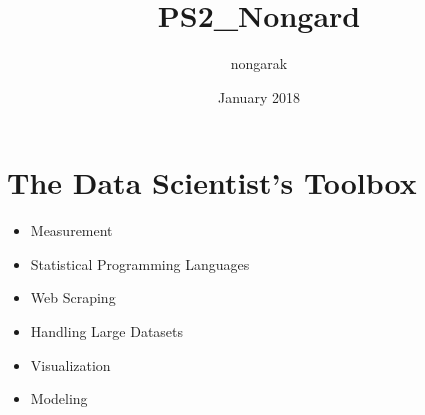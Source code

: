 \documentclass{article}
\title{PS2_Nongard}
\author{nongarak }
\date{January 2018}
\begin{document}
\maketitle

\section{The Data Scientist's Toolbox}
\begin{itemize}
    \item Measurement
    \item Statistical Programming Languages
    \item Web Scraping
    \item Handling Large Datasets
    \item Visualization
    \item Modeling
\end{itemize}
\end{document}
